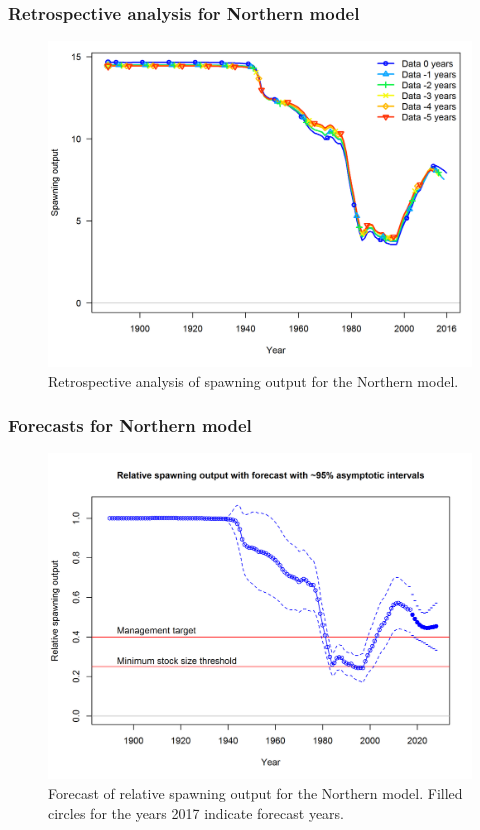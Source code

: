 \documentclass[12pt,]{article}
\begin{document}
\FloatBarrier

\subsubsection{Retrospective analysis for Northern
model}\label{retrospective-analysis-for-northern-model}

\begin{figure}[htbp]
\centering
\includegraphics{Figures/retrospectives/retro.N_compare1_spawnbio.png}
\caption{Retrospective analysis of spawning output for the Northern
model. \label{fig:retro.N}}
\end{figure}

\FloatBarrier

\subsubsection{Forecasts for Northern
model}\label{forecasts-for-northern-model}

\begin{figure}[htbp]
\centering
\includegraphics{r4ss/plots_mod1/ts9_Relative_spawning_output_with_forecast_with_95_asymptotic_intervals_forecast_intervals.png}
\caption{Forecast of relative spawning output for the Northern model.
Filled circles for the years 2017 indicate forecast years.
\label{fig:forecast.N}}
\end{figure}
\end{document}
